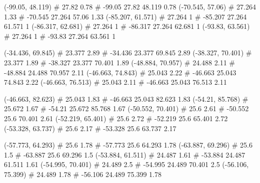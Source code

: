 \documentclass[a4paper,openbib,10pt]{article}
\newenvironment{treegraph}{\begin{graph}}{\end{graph}}
\begin{document}
\begin{treegraph}
  (-99.05, 48.119) #     27.82    0.78
   #    -99.05    27.82    48.119    0.78
  (-70.545, 57.06) #     27.264    1.33
   #    -70.545    27.264    57.06    1.33
  (-85.207, 61.571) #     27.264    1
   #    -85.207    27.264    61.571    1
  (-86.317, 62.681) #     27.264    1
   #    -86.317    27.264    62.681    1
  (-93.83, 63.561) #     27.264    1
   #    -93.83    27.264    63.561    1

  (-34.436, 69.845) #     23.377    2.89
   #    -34.436    23.377    69.845    2.89
  (-38.327, 70.401) #     23.377    1.89
   #    -38.327    23.377    70.401    1.89
  (-48.884, 70.957) #     24.488    2.11
   #    -48.884    24.488    70.957    2.11
  (-46.663, 74.843) #     25.043    2.22
   #    -46.663    25.043    74.843    2.22
  (-46.663, 76.513) #     25.043    2.11
   #    -46.663    25.043    76.513    2.11

  (-46.663, 82.623) #     25.043    1.83
   #    -46.663    25.043    82.623    1.83
  (-54.21, 85.768) #     25.672    1.67
   #    -54.21    25.672    85.768    1.67
  (-50.552, 70.401) #     25.6    2.61
   #    -50.552    25.6    70.401    2.61
  (-52.219, 65.401) #     25.6    2.72
   #    -52.219    25.6    65.401    2.72
  (-53.328, 63.737) #     25.6    2.17
   #    -53.328    25.6    63.737    2.17

  (-57.773, 64.293) #     25.6    1.78
   #    -57.773    25.6    64.293    1.78
  (-63.887, 69.296) #     25.6    1.5
   #    -63.887    25.6    69.296    1.5
  (-53.884, 61.511) #     24.487    1.61
   #    -53.884    24.487    61.511    1.61
  (-54.995, 70.401) #     24.489    2.5
   #    -54.995    24.489    70.401    2.5
  (-56.106, 75.399) #     24.489    1.78
   #    -56.106    24.489    75.399    1.78


\end{treegraph}
\end{document}
